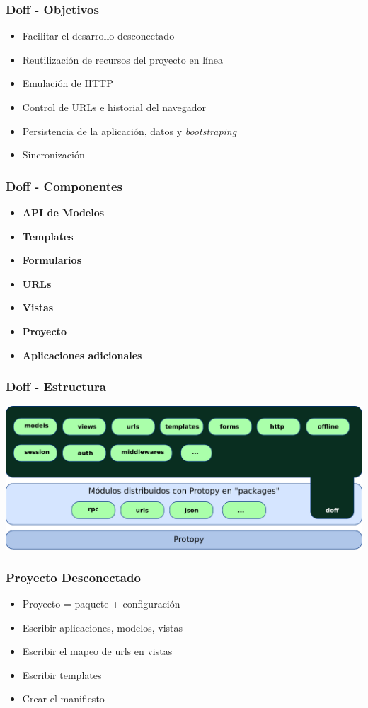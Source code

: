 \documentclass{beamer}
\begin{document}
\begin{frame}
    \frametitle{Doff - Objetivos}
    \begin{itemize}
        \item{Facilitar el desarrollo desconectado}
        \item{Reutilización de recursos del proyecto en línea}
        \item{Emulación de HTTP}
        \item{Control de URLs e historial del navegador}
        \item{Persistencia de la aplicación, datos y {\it bootstraping}}
        \item{Sincronización}
        \end{itemize}
\end{frame}
    

\begin{frame}
    \frametitle{Doff - Componentes}
    \begin{itemize}
        \item {\bf API de Modelos }
        \item {\bf Templates }
        \item {\bf Formularios }
        \item {\bf URLs }
        \item {\bf Vistas }
        \item {\bf Proyecto }
        \item {\bf Aplicaciones adicionales }
    \end{itemize}
\end{frame}

\begin{frame}
    \frametitle{Doff - Estructura}
    \includegraphics[scale=0.5]{esquema_doff.pdf}
\end{frame}

\begin{frame}
    \frametitle{Proyecto Desconectado}
    \begin{itemize}
        \item{Proyecto = paquete + configuración}
        \item{Escribir aplicaciones, modelos, vistas}
        \item{Escribir el mapeo de urls en vistas}
        \item{Escribir templates}
        \item{Crear el manifiesto}
    \end{itemize}
\end{frame}
\end{document}
